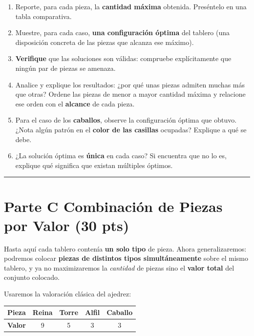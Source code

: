 \documentclass[12pt,a4paper]{article}
\begin{document}
\begin{enumerate}[label=\alph*), leftmargin=*, topsep=2pt]
    \item Reporte, para cada pieza, la \textbf{cantidad máxima} obtenida.
          Preséntelo en una tabla comparativa.
    \item Muestre, para cada caso, \textbf{una configuración óptima} del tablero
          (una disposición concreta de las piezas que alcanza ese máximo).
    \item \textbf{Verifique} que las soluciones son válidas: compruebe
          explícitamente que ningún par de piezas se amenaza.
    \item Analice y explique los resultados: ¿por qué unas piezas admiten muchas
          más que otras? Ordene las piezas de menor a mayor cantidad máxima y
          relacione ese orden con el \textbf{alcance} de cada pieza.
    \item Para el caso de los \textbf{caballos}, observe la configuración óptima
          que obtuvo. ¿Nota algún patrón en el \textbf{color de las casillas}
          ocupadas? Explique a qué se debe.
    \item ¿La solución óptima es \textbf{única} en cada caso? Si encuentra que no
          lo es, explique qué significa que existan múltiples óptimos.
\end{enumerate}

\noindent\rule{\linewidth}{0.4pt}
\newpage

\section*{Parte C \quad Combinación de Piezas por Valor \hfill\normalfont\normalsize(30 pts)}

Hasta aquí cada tablero contenía \textbf{un solo tipo} de pieza. Ahora
generalizaremos: podremos colocar \textbf{piezas de distintos tipos
simultáneamente} sobre el mismo tablero, y ya no maximizaremos la \emph{cantidad}
de piezas sino el \textbf{valor total} del conjunto colocado.

Usaremos la valoración clásica del ajedrez:

\begin{center}
\renewcommand{\arraystretch}{1.2}
\begin{tabular}{lcccc}
\toprule
\textbf{Pieza} & Reina & Torre & Alfil & Caballo \\
\midrule
\textbf{Valor} & 9 & 5 & 3 & 3 \\
\bottomrule
\end{tabular}
\end{center}
\end{document}
